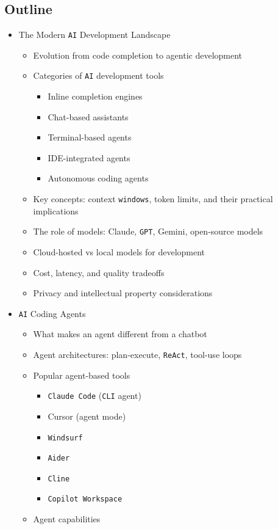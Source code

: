 \documentclass[
]{article}
\providecommand{\tightlist}{%
  \setlength{\itemsep}{0pt}\setlength{\parskip}{0pt}}
\begin{document}
\subsection{Outline}\label{outline}

\begin{itemize}
\tightlist
\item
  The Modern \texttt{AI} Development Landscape

  \begin{itemize}
  \tightlist
  \item
    Evolution from code completion to agentic development
  \item
    Categories of \texttt{AI} development tools

    \begin{itemize}
    \tightlist
    \item
      Inline completion engines
    \item
      Chat-based assistants
    \item
      Terminal-based agents
    \item
      IDE-integrated agents
    \item
      Autonomous coding agents
    \end{itemize}
  \item
    Key concepts: context \texttt{windows}, token limits, and their
    practical implications
  \item
    The role of models: Claude, \texttt{GPT}, Gemini, open-source models
  \item
    Cloud-hosted vs local models for development
  \item
    Cost, latency, and quality tradeoffs
  \item
    Privacy and intellectual property considerations
  \end{itemize}
\item
  \texttt{AI} Coding Agents

  \begin{itemize}
  \tightlist
  \item
    What makes an agent different from a chatbot
  \item
    Agent architectures: plan-execute, \texttt{ReAct}, tool-use loops
  \item
    Popular agent-based tools

    \begin{itemize}
    \tightlist
    \item
      \texttt{Claude\ Code} (\texttt{CLI} agent)
    \item
      Cursor (agent mode)
    \item
      \texttt{Windsurf}
    \item
      \texttt{Aider}
    \item
      \texttt{Cline}
    \item
      \texttt{Copilot\ Workspace}
    \end{itemize}
  \item
    Agent capabilities


\end{itemize}
\end{itemize}
\end{document}
